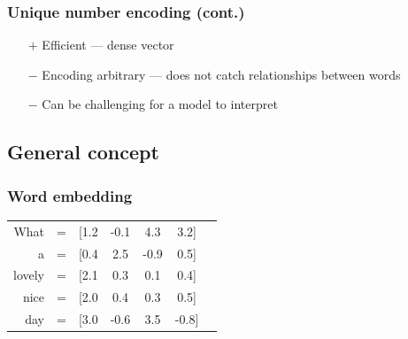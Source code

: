 

\begin{frame}
\frametitle{Unique number encoding (cont.)}

	\begin{itemize}
		\item[$+$] Efficient --- dense vector
		\item[$-$] Encoding arbitrary --- does not catch relationships between words
		\item[$-$] Can be challenging for a model to interpret
	\end{itemize}

\end{frame}


\subsection{General concept}


\begin{frame}
\frametitle{Word embedding}

\begin{table}[h]
	\hspace{15mm}
	\huge
	\begin{tabular}{rcccccc}
		What & = & [1.2 & -0.1 & 4.3 & 3.2] \\
		a & = & [0.4 & 2.5 & -0.9 & 0.5] \\
		lovely & = & [2.1 & 0.3 & 0.1& 0.4] \\
		nice & = & [2.0& 0.4& 0.3& 0.5] \\
		day & = & [3.0& -0.6& 3.5& -0.8] \\
	\end{tabular}
\end{table}



\end{frame}

